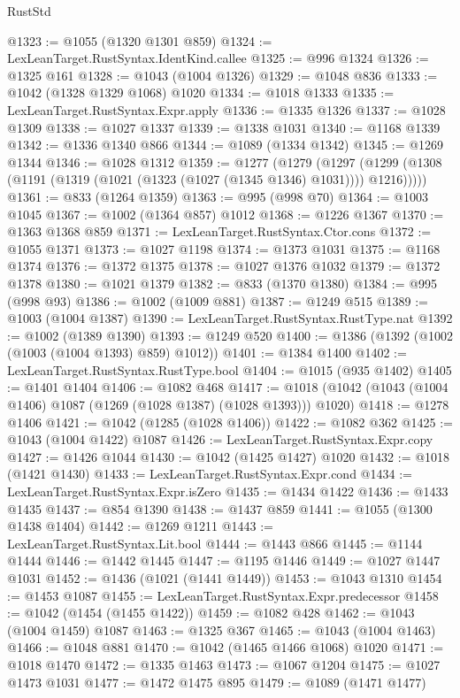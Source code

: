 \begin{lexlean}{RustStd}
\begin{coremodule}
{\begin{coremodule}
{{{{{{{{{{{{{{{{{{{{{{{{{{@1323 := @1055 (@1320 @1301 @859)
@1324 := LexLeanTarget.RustSyntax.IdentKind.callee
@1325 := @996 @1324
@1326 := @1325 @161
@1328 := @1043 (@1004 @1326)
@1329 := @1048 @836
@1333 := @1042 (@1328 @1329 @1068) @1020
@1334 := @1018 @1333
@1335 := LexLeanTarget.RustSyntax.Expr.apply
@1336 := @1335 @1326
@1337 := @1028 @1309
@1338 := @1027 @1337
@1339 := @1338 @1031
@1340 := @1168 @1339
@1342 := @1336 @1340 @866
@1344 := @1089 (@1334 @1342)
@1345 := @1269 @1344
@1346 := @1028 @1312
@1359 := @1277
    (@1279
      (@1297 (@1299 (@1308 (@1191 (@1319 (@1021 (@1323 (@1027 (@1345 @1346) @1031)))) @1216)))))
@1361 := @833 (@1264 @1359)
@1363 := @995 (@998 @70)
@1364 := @1003 @1045
@1367 := @1002 (@1364 @857) @1012
@1368 := @1226 @1367
@1370 := @1363 @1368 @859
@1371 := LexLeanTarget.RustSyntax.Ctor.cons
@1372 := @1055 @1371
@1373 := @1027 @1198
@1374 := @1373 @1031
@1375 := @1168 @1374
@1376 := @1372 @1375
@1378 := @1027 @1376 @1032
@1379 := @1372 @1378
@1380 := @1021 @1379
@1382 := @833 (@1370 @1380)
@1384 := @995 (@998 @93)
@1386 := @1002 (@1009 @881)
@1387 := @1249 @515
@1389 := @1003 (@1004 @1387)
@1390 := LexLeanTarget.RustSyntax.RustType.nat
@1392 := @1002 (@1389 @1390)
@1393 := @1249 @520
@1400 := @1386 (@1392 (@1002 (@1003 (@1004 @1393) @859) @1012))
@1401 := @1384 @1400
@1402 := LexLeanTarget.RustSyntax.RustType.bool
@1404 := @1015 (@935 @1402)
@1405 := @1401 @1404
@1406 := @1082 @468
@1417 := @1018 (@1042 (@1043 (@1004 @1406) @1087 (@1269 (@1028 @1387) (@1028 @1393))) @1020)
@1418 := @1278 @1406
@1421 := @1042 (@1285 (@1028 @1406))
@1422 := @1082 @362
@1425 := @1043 (@1004 @1422) @1087
@1426 := LexLeanTarget.RustSyntax.Expr.copy
@1427 := @1426 @1044
@1430 := @1042 (@1425 @1427) @1020
@1432 := @1018 (@1421 @1430)
@1433 := LexLeanTarget.RustSyntax.Expr.cond
@1434 := LexLeanTarget.RustSyntax.Expr.isZero
@1435 := @1434 @1422
@1436 := @1433 @1435
@1437 := @854 @1390
@1438 := @1437 @859
@1441 := @1055 (@1300 @1438 @1404)
@1442 := @1269 @1211
@1443 := LexLeanTarget.RustSyntax.Lit.bool
@1444 := @1443 @866
@1445 := @1144 @1444
@1446 := @1442 @1445
@1447 := @1195 @1446
@1449 := @1027 @1447 @1031
@1452 := @1436 (@1021 (@1441 @1449))
@1453 := @1043 @1310
@1454 := @1453 @1087
@1455 := LexLeanTarget.RustSyntax.Expr.predecessor
@1458 := @1042 (@1454 (@1455 @1422))
@1459 := @1082 @428
@1462 := @1043 (@1004 @1459) @1087
@1463 := @1325 @367
@1465 := @1043 (@1004 @1463)
@1466 := @1048 @881
@1470 := @1042 (@1465 @1466 @1068) @1020
@1471 := @1018 @1470
@1472 := @1335 @1463
@1473 := @1067 @1204
@1475 := @1027 @1473 @1031
@1477 := @1472 @1475 @895
@1479 := @1089 (@1471 @1477)
}}}}}}}}}}}}}}}}}}}}}}}}}}
\end{coremodule}}
\end{coremodule}
\end{lexlean}
